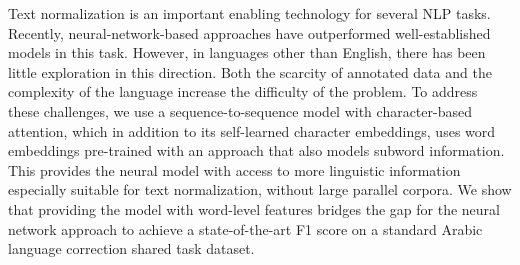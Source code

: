 Text normalization is an important enabling technology for several NLP tasks. Recently, neural-network-based approaches have outperformed well-established models in this task. However, in languages other than English, there has been little exploration in this direction. Both the scarcity of annotated data and the complexity of the language increase the difficulty of the problem. To address these challenges, we use a sequence-to-sequence model with character-based attention, which in addition to its self-learned character embeddings, uses word embeddings pre-trained with an approach that also models subword information. This provides the neural model with access to more linguistic information especially suitable for text normalization, without large parallel corpora. We show that providing the model with word-level features bridges the gap for the neural network approach to achieve a state-of-the-art F1 score on a standard Arabic language correction shared task dataset.
